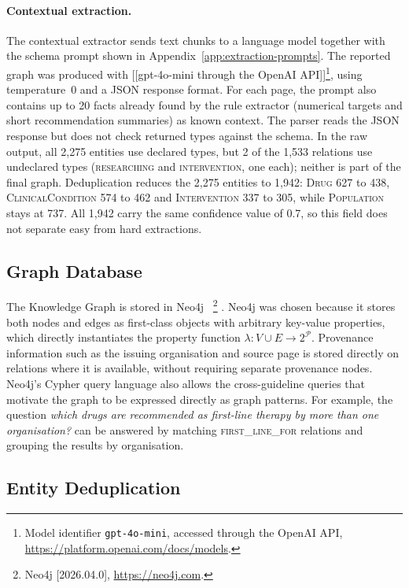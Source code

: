 \paragraph{Contextual extraction.}
The contextual extractor sends text chunks to a language model together with the
schema prompt shown in Appendix~\ref{app:extraction-prompts}. The reported graph
was produced with [[gpt-4o-mini through the OpenAI API]]\footnote{Model
identifier \texttt{gpt-4o-mini}, accessed through the OpenAI API,
\url{https://platform.openai.com/docs/models}.}, using
temperature~0 and a JSON response format. For each page, the prompt also contains
up to 20 facts already found by the rule extractor (numerical targets and short
recommendation summaries) as known context. The parser reads the JSON response but
does not check returned types against the schema. In the raw output, all 2,275
entities use declared types, but 2 of the 1,533 relations use undeclared types
(\textsc{researching} and \textsc{intervention}, one each); neither is part of the
final graph. Deduplication reduces the 2,275 entities to 1,942: \textsc{Drug} 627
to 438, \textsc{ClinicalCondition} 574 to 462 and \textsc{Intervention} 337 to 305,
while \textsc{Population} stays at 737. All 1,942 carry the same confidence value
of 0.7, so this field does not separate easy from hard extractions.


\subsection{Graph Database}
\label{sec:graph-db}

The Knowledge Graph is stored in Neo4j ~\cite{barrasa2023}\footnote{Neo4j [2026.04.0], \url{https://neo4j.com}.}
. Neo4j was chosen because it
stores both nodes and edges as first-class objects with arbitrary key-value
properties, which directly instantiates the property function
$\lambda: V \cup E \rightarrow 2^{\mathcal{P}}$. Provenance information such as the issuing organisation and source page
is stored directly on relations where it is available, without requiring
separate provenance nodes. Neo4j's Cypher query language also allows the
cross-guideline queries that motivate the graph to be expressed directly
as graph patterns. For example, the question \textit{which drugs are
recommended as first-line therapy by more than one organisation?} can be
answered by matching \textsc{first\_line\_for} relations and grouping the
results by organisation.

\subsection{Entity Deduplication}
\label{sec:dedup}

